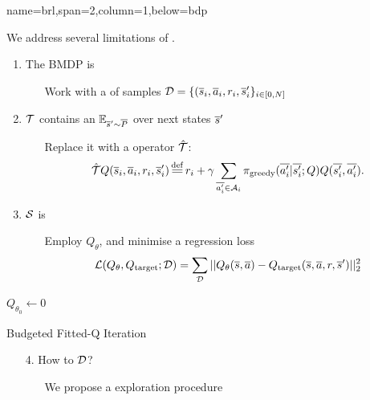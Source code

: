\documentclass[a0paper,portrait,fontscale=0.355, margin=2cm]{baposter}
\begin{document}
\begin{poster}
{name=brl,span=2,column=1,below=bdp}{ 

We address several limitations of .\\

\begin{minipage}{0.65\textwidth}
\begin{enumerate}
    \item The BMDP is 
\begin{itemize}[nolistsep]
    \item[\incarrow] Work with a  of samples $\mathcal{D}=\{(\overline{s}_i,\overline{a}_i,r_i,\overline{s}_i'\}_{i\in [0,N]}$
\end{itemize}
\item $\mathcal{T}$ contains an  $\operatorname*{\mathbb{E}}_{\overline{s}'\sim \overline{P}}$ over next states $\overline{s}'$
\begin{itemize}[nolistsep]
    \item[\incarrow] Replace it with a  operator $\hat{\mathcal{T}}$:
\begin{equation*}
    \hat{\cT} Q(\os_i, \oa_i, r_i, \os'_i) \eqdef r_i + \gamma \sum_{\ov{a'_i}\in \cA_i} \pi_\text{greedy}(\ov{a'_i}|\ov{s'_i}; Q) Q(\ov{s'_i}, \ov{a'_i}).
\end{equation*}
\end{itemize}
\item $\mathcal{S}$ is 
\begin{itemize}[nolistsep]
    \item[\incarrow] Employ  $Q_\theta$, and minimise a regression loss 
    $$\mathcal{L}(Q_\theta, Q_\text{target};\mathcal{D}) = \sum_{\mathcal{D}} ||Q_\theta(\overline{s}, \overline{a}) - Q_\text{target}(\overline{s}, \overline{a}, r, \overline{s}')||_2^2$$
\end{itemize}
\end{enumerate}

\end{minipage}
\begin{minipage}{0.34\textwidth}
\begin{algorithm}[H]
\DontPrintSemicolon
\KwData{$\cD$}
$Q_{\theta_0} \leftarrow 0$\;
\caption{Budgeted Fitted-Q Iteration}
\label{algo:bftq}
\end{algorithm}
\vspace{1em}
\begin{enumerate}[nolistsep]
    \item[4.] How to  $\cD$?
    \begin{itemize}[nolistsep]
        \item[\incarrow] We propose a  exploration procedure
    \end{itemize}
\end{enumerate}
\end{minipage}
}


\end{poster}
\end{document}

